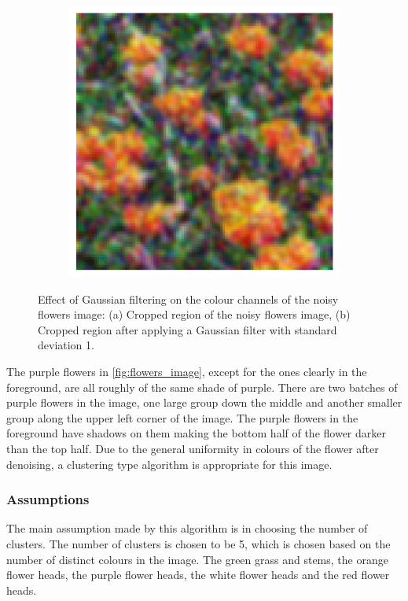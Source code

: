 \documentclass[11pt]{article}
\begin{document}
\begin{figure}[H]
\begin{subfigure}{.4\textwidth}
        \includegraphics[width=\linewidth]{figs/q1b_gauss_blurred_patch.png}  %
        \caption{}
        \label{fig:gaussian_filtered_flower_patch}
    \end{subfigure}%
    \caption{Effect of Gaussian filtering on the colour channels of the noisy flowers image: (a) Cropped region of the noisy flowers image, (b) Cropped region after applying a Gaussian filter with standard deviation 1.}
    \label{fig:gaussian_noise_evidence}
\end{figure}
The purple flowers in \ref{fig:flowers_image}, except for the ones clearly in the foreground, are all roughly of the same shade of purple. There are two batches of purple flowers in the image, one large group down the middle and another smaller group along the upper left corner of the image. The purple flowers in the foreground have shadows on them making the bottom half of the flower darker than the top half. Due to the general uniformity in colours of the flower after denoising, a clustering type algorithm is appropriate for this image.

\subsubsection{Assumptions}
The main assumption made by this algorithm is in choosing the number of clusters. The number of clusters is chosen to be 5, which is chosen based on the number of distinct colours in the image. The green grass and stems, the orange flower heads, the purple flower heads, the white flower heads and the red flower heads.
\end{document}
